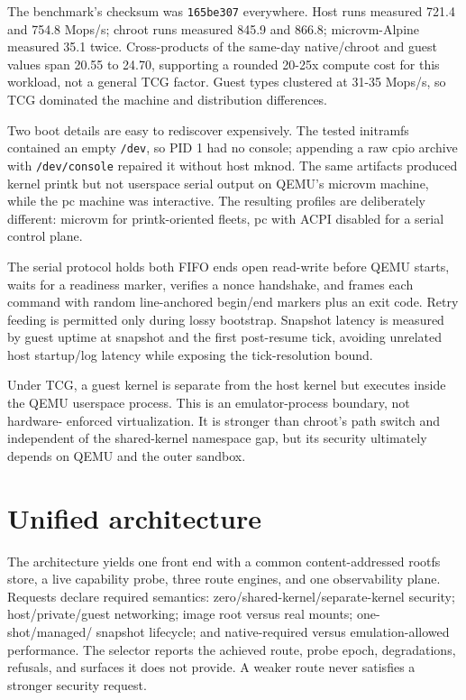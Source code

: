 \documentclass[10pt,twocolumn]{article}
\begin{document}
The benchmark's checksum was \texttt{165be307} everywhere. Host runs measured 721.4 and 754.8 Mops/s; chroot runs measured 845.9 and 866.8; microvm-Alpine measured 35.1 twice. Cross-products of the same-day native/chroot and guest values span 20.55 to 24.70, supporting a rounded 20-25x compute cost for this workload, not a general TCG factor. Guest types clustered at 31-35 Mops/s, so TCG dominated the machine and distribution differences.

Two boot details are easy to rediscover expensively. The tested initramfs contained an empty \texttt{/dev}, so PID 1 had no console; appending a raw cpio archive with \texttt{/dev/console} repaired it without host mknod. The same artifacts produced kernel printk but not userspace serial output on QEMU's microvm machine, while the pc machine was interactive. The resulting profiles are deliberately different: microvm for printk-oriented fleets, pc with ACPI disabled for a serial control plane.

The serial protocol holds both FIFO ends open read-write before QEMU starts, waits for a readiness marker, verifies a nonce handshake, and frames each command with random line-anchored begin/end markers plus an exit code. Retry feeding is permitted only during lossy bootstrap. Snapshot latency is measured by guest uptime at snapshot and the first post-resume tick, avoiding unrelated host startup/log latency while exposing the tick-resolution bound.

Under TCG, a guest kernel is separate from the host kernel but executes inside the QEMU userspace process. This is an emulator-process boundary, not hardware- enforced virtualization. It is stronger than chroot's path switch and independent of the shared-kernel namespace gap, but its security ultimately depends on QEMU and the outer sandbox.

\section{Unified architecture}
The architecture yields one front end with a common content-addressed rootfs store, a live capability probe, three route engines, and one observability plane. Requests declare required semantics: zero/shared-kernel/separate-kernel security; host/private/guest networking; image root versus real mounts; one-shot/managed/ snapshot lifecycle; and native-required versus emulation-allowed performance. The selector reports the achieved route, probe epoch, degradations, refusals, and surfaces it does not provide. A weaker route never satisfies a stronger security request.
\end{document}
